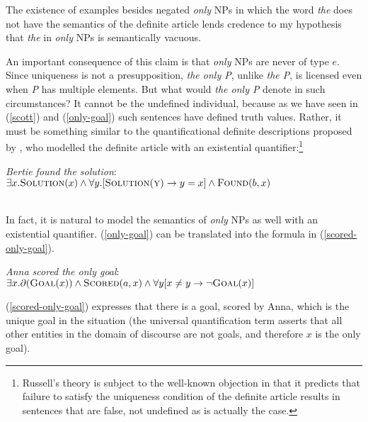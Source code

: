 The existence of examples besides negated \textit{only} NPs in which the word \textit{the} does not have the semantics of the definite article lends credence to my hypothesis that \textit{the} in \textit{only} NPs is semantically vacuous.

An important consequence of this claim is that \textit{only} NPs are never of type $e$. Since uniqueness is not a presupposition, \textit{the only P}, unlike \textit{the P}, is licensed even when \textit{P} has multiple elements. But what would \textit{the only P} denote in such circumstances? It cannot be the undefined individual, because as we have seen in (\ref{scott}) and (\ref{only-goal}) such sentences have defined truth values. Rather, it must be something similar to the quantificational definite descriptions proposed by \citet{russell}, who modelled the definite article with an existential quantifier:\footnote{Russell's theory is subject to the well-known objection in \citet{strawson50} that it predicts that failure to satisfy the uniqueness condition of the definite article results in sentences that are false, not undefined as is actually the case.}

\begin{exe}
	\ex \textit{Bertie found the solution}: \\
	$\exists x . \textsc{Solution}(x) \land \forall y . [\textsc{Solution(y)} \to y = x] \land \textsc{Found}(b, x)$ \\ \\
	\hspace*{\fill} \citep[ex. 1$'$]{horn-abbott-2012}  %
\end{exe}

In fact, it is natural to model the semantics of \textit{only} NPs as well with an existential quantifier. (\ref{only-goal}) can be translated into the formula in (\ref{scored-only-goal}).

\begin{exe}
	\ex \label{scored-only-goal} \textit{Anna scored the only goal}: \\ $\exists x . \partial(\textsc{Goal}(x)) \land \textsc{Scored}(a, x) \land \forall y [ x \ne y \to \neg \textsc{Goal}(x) ] $
\end{exe}

(\ref{scored-only-goal}) expresses that there is a goal, scored by Anna, which is the unique goal in the situation (the universal quantification term asserts that all other entities in the domain of discourse are not goals, and therefore $x$ is the only goal).

